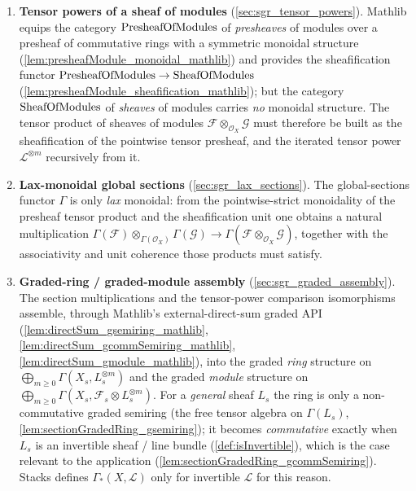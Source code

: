 \begin{enumerate}
  \item \textbf{Tensor powers of a sheaf of modules}
    (\cref{sec:sgr_tensor_powers}). Mathlib equips the category
    \(\mathrm{PresheafOfModules}\) of \emph{presheaves} of modules over a presheaf of commutative
    rings with a symmetric monoidal structure
    (\cref{lem:presheafModule_monoidal_mathlib}) and provides the
    sheafification functor \(\mathrm{PresheafOfModules} \to \mathrm{SheafOfModules}\)
    (\cref{lem:presheafModule_sheafification_mathlib}); but the category
    \(\mathrm{SheafOfModules}\) of \emph{sheaves} of modules carries \emph{no} monoidal
    structure. The tensor product of sheaves of modules
    \(\mathcal{F} \otimes_{\mathcal{O}_X} \mathcal{G}\) must therefore be built
    as the sheafification of the pointwise tensor presheaf, and the iterated
    tensor power \(\mathcal{L}^{\otimes m}\) recursively from it.
  \item \textbf{Lax-monoidal global sections} (\cref{sec:sgr_lax_sections}).
    The global-sections functor \(\Gamma\) is only \emph{lax} monoidal: from the
    pointwise-strict monoidality of the presheaf tensor product and the
    sheafification unit one obtains a natural multiplication
    \(\Gamma(\mathcal{F}) \otimes_{\Gamma(\mathcal{O}_X)} \Gamma(\mathcal{G})
    \to \Gamma(\mathcal{F} \otimes_{\mathcal{O}_X} \mathcal{G})\), together with
    the associativity and unit coherence those products must satisfy.
  \item \textbf{Graded-ring / graded-module assembly}
    (\cref{sec:sgr_graded_assembly}). The section multiplications and the
    tensor-power comparison isomorphisms assemble, through Mathlib's
    external-direct-sum graded API (\cref{lem:directSum_gsemiring_mathlib},
    \cref{lem:directSum_gcommSemiring_mathlib}, \cref{lem:directSum_gmodule_mathlib}),
    into the graded \emph{ring} structure on
    \(\bigoplus_{m \ge 0} \Gamma(X_s, L_s^{\otimes m})\) and the graded
    \emph{module} structure on
    \(\bigoplus_{m \ge 0} \Gamma(X_s, \mathcal{F}_s \otimes L_s^{\otimes m})\).
    For a \emph{general} sheaf \(L_s\) the ring is only a non-commutative graded
    semiring (the free tensor algebra on \(\Gamma(L_s)\),
    \cref{lem:sectionGradedRing_gsemiring}); it becomes \emph{commutative} exactly
    when \(L_s\) is an invertible sheaf / line bundle (\cref{def:isInvertible}),
    which is the case relevant to the application
    (\cref{lem:sectionGradedRing_gcommSemiring}). Stacks defines
    \(\Gamma_*(X,\mathcal{L})\) only for invertible \(\mathcal{L}\) for this reason.
\end{enumerate}

